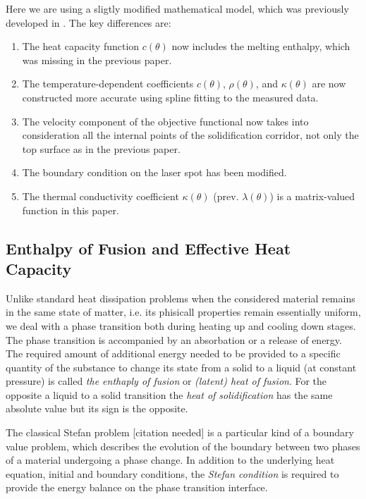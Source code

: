 {\color{TolHighContrastBlue}
Here we are using a sligtly modified mathematical model, which was previously developed in \cite{BergmannBieleninHerzogHildebrandRiedelSchrickerTrunkWorthmann:2017:1}.
The key differences are:
\begin{enumerate}
	\item The heat capacity function $c(\theta)$ now includes the melting enthalpy, which was missing in the previous paper.
	\item The temperature-dependent coefficients $c(\theta)$, $\rho(\theta)$, and $\kappa(\theta)$ are now constructed more accurate using spline fitting to the measured data.
	\item The velocity component of the objective functional now takes into consideration all the internal points of the solidification corridor, not only the top surface as in the previous paper.
	\item The boundary condition on the laser spot has been modified.
	\item The thermal conductivity coefficient $\kappa(\theta)$ (prev. $\lambda(\theta)$) is a matrix-valued function in this paper.
\end{enumerate}
}


\subsection{Enthalpy of Fusion and Effective Heat Capacity}

Unlike standard heat dissipation problems when the considered material remains in the same state of matter, i.e. its phisicall properties remain essentially uniform, we deal with a phase transition both during heating up and cooling down stages. The phase transition is accompanied by an absorbation or a release of energy. The required amount of additional energy needed to be provided to a specific quantity of the substance to change its state from a solid to a liquid (at constant pressure) is called \emph{the enthaply of fusion} or \emph{(latent) heat of fusion}. For the opposite a liquid to a solid transition the \emph{heat of solidification} has the same absolute value but its sign is the opposite.

The classical Stefan problem [citation needed] is a particular kind of a boundary value problem, which describes the evolution of the boundary between two phases of a material undergoing a phase change. In addition to the underlying heat equation, initial and boundary conditions, the \emph{Stefan condition} is required to provide the energy balance on the phase transition interface.

